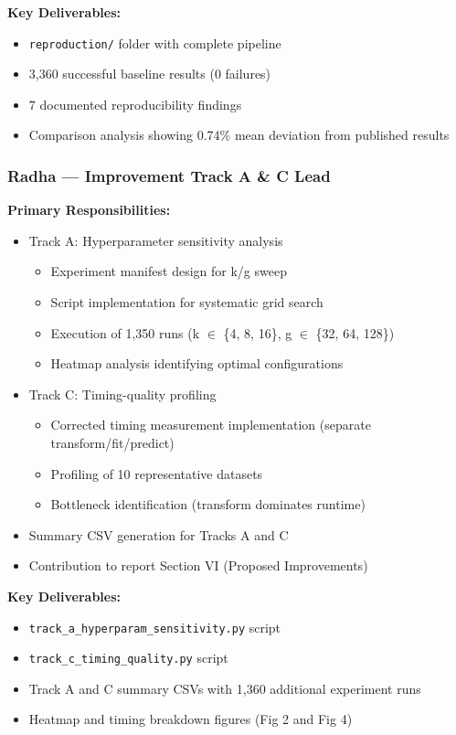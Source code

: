\documentclass[conference]{IEEEtran}
\begin{document}
\textbf{Key Deliverables:}
\begin{itemize}
  \item \texttt{reproduction/} folder with complete pipeline
  \item 3,360 successful baseline results (0 failures)
  \item 7 documented reproducibility findings
  \item Comparison analysis showing 0.74\% mean deviation from published results
\end{itemize}

\subsubsection*{Radha — Improvement Track A \& C Lead}

\textbf{Primary Responsibilities:}
\begin{itemize}
  \item Track A: Hyperparameter sensitivity analysis
    \begin{itemize}
      \item Experiment manifest design for k/g sweep
      \item Script implementation for systematic grid search
      \item Execution of 1,350 runs (k $\in$ \{4, 8, 16\}, g $\in$ \{32, 64, 128\})
      \item Heatmap analysis identifying optimal configurations
    \end{itemize}
  \item Track C: Timing-quality profiling
    \begin{itemize}
      \item Corrected timing measurement implementation (separate transform/fit/predict)
      \item Profiling of 10 representative datasets
      \item Bottleneck identification (transform dominates runtime)
    \end{itemize}
  \item Summary CSV generation for Tracks A and C
  \item Contribution to report Section VI (Proposed Improvements)
\end{itemize}

\textbf{Key Deliverables:}
\begin{itemize}
  \item \texttt{track\_a\_hyperparam\_sensitivity.py} script
  \item \texttt{track\_c\_timing\_quality.py} script
  \item Track A and C summary CSVs with 1,360 additional experiment runs
  \item Heatmap and timing breakdown figures (Fig 2 and Fig 4)
\end{itemize}
\end{document}
